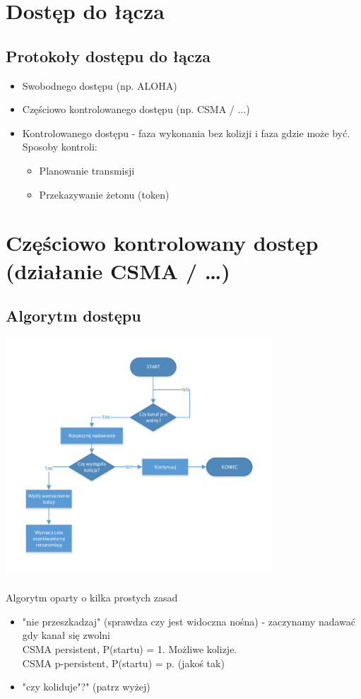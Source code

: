 \documentclass[a4paper,twoside]{article}
\begin{document}
\section{Dostęp do łącza}
\subsection{Protokoły dostępu do łącza}
\begin{itemize}
	\item Swobodnego dostępu (np. ALOHA)
	\item Częściowo kontrolowanego dostępu (np. CSMA / ...)
	\item Kontrolowanego dostępu - faza wykonania bez kolizji i faza gdzie może być.\\Sposoby kontroli:
	\begin{itemize}
		\item Planowanie transmisji
		\item Przekazywanie żetonu (token)
	\end{itemize}
\end{itemize}

\section{Częściowo kontrolowany dostęp (działanie CSMA / …)}
\subsection{Algorytm dostępu}
\includegraphics[width=10cm]{./images/image20.pdf}\\\\
Algorytm oparty o kilka prostych zasad
\begin{itemize}
	\item "nie przeszkadzaj" (sprawdza czy jest widoczna nośna) - zaczynamy nadawać gdy kanał się zwolni\\
	CSMA persistent, P(startu) = 1. Możliwe kolizje.\\
	CSMA p-persistent, P(startu) = p. (jakoś tak)
	\item "czy koliduje"?" (patrz wyżej)
\end{itemize}
\end{document}

